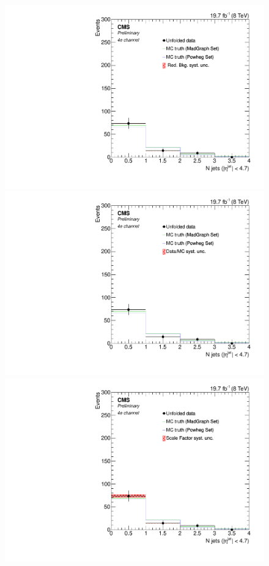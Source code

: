 \begin{figure}[hbtp]
\begin{center}
    \includegraphics[width=0.8\cmsFigWidth]{Figures/Unfolding/Systematics/ZZTo4e_Jets_RedBkg_Mad_fr}     
    \includegraphics[width=0.8\cmsFigWidth]{Figures/Unfolding/Systematics/ZZTo4e_Jets_UnfDataOverGenMC_Mad_fr}  
     \includegraphics[width=0.8\cmsFigWidth]{Figures/Unfolding/Systematics/ZZTo4e_Jets_SFSq_Mad_fr}       

\end{center}
\end{figure}
